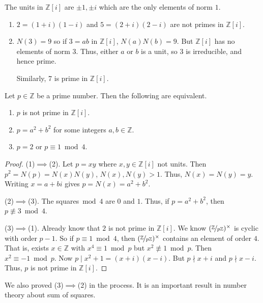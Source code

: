 The units in \(\mathbb{Z}[i]\) are \(\pm 1, \pm i\) which are the only elements of norm \(1\).
\begin{example}
    \begin{enumerate}
        \item \(2 = (1+i)(1-i)\) and \(5 = (2 + i)(2-i)\) are not primes in \(\mathbb{Z}[i]\).
        \item \(N(3) = 9\) so if \(3 = ab\) in \(\mathbb{Z}[i]\), \(N(a)N(b) = 9\). But \(\mathbb{Z}[i]\) has no elements of norm \(3\). Thus, either \(a\) or \(b\) is a unit, so \(3\) is irreducible, and hence prime.
        
        Similarly, 7 is prime in \(\mathbb{Z}[i]\).
    \end{enumerate}
\end{example}
\begin{proposition}
    \label{ratprime}
    Let \(p \in \mathbb{Z}\) be a prime number. Then the following are equivalent.
    \begin{enumerate}
        \item \(p\) is not prime in \(\mathbb{Z}[i]\).
        \item \(p = a^2 + b^2\) for some integers \(a, b \in \mathbb{Z}\).
        \item \(p = 2\) or \(p \equiv 1 \bmod 4\).
    \end{enumerate}
\end{proposition}
\begin{proof}
    (1)\(\implies\)(2). Let \(p = xy\) where \(x, y \in \mathbb{Z}[i]\) not units. Then \(p^2 = N(p) = N(x)N(y)\), \(N(x),N(y) > 1\). Thus, \(N(x) = N(y) = y\). Writing \(x = a + bi\) gives \(p = N(x) = a^2 + b^2\).

    (2)\(\implies\)(3). The squares\({}\bmod 4\) are \(0\) and \(1\). Thus, if \(p = a^2 + b^2\), then \(p \not\equiv 3 \bmod 4\).
    
    (3)\(\implies\)(1). Already know that \(2\) is not prime in \(\mathbb{Z}[i]\). We know \((\nicefrac{\mathbb{Z}}{p\mathbb{Z}})^\times\) is cyclic with order \(p - 1\). So if \(p \equiv 1 \bmod 4\), then \((\nicefrac{\mathbb{Z}}{p\mathbb{Z}})^\times\) contains an element of order \(4\). That is, exists \(x \in \mathbb{Z}\) with \(x^4 \equiv 1 \bmod p\) but \(x^2 \not \equiv 1 \bmod p\). Then \(x^2 \equiv -1 \bmod p\). Now \(p \mid x^2 + 1 = (x + i)(x - i)\). But \(p \nmid x + i\) and \(p \nmid x - i\). Thus, \(p\) is not prime in \(\mathbb{Z}[i]\).
\end{proof}
\begin{remark}
    We also proved (3)\(\implies\)(2) in the process. It is an important result in number theory about sum of squares.
\end{remark}
